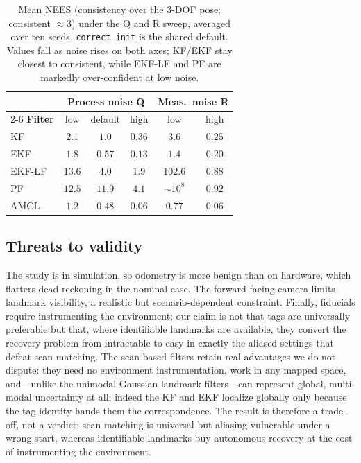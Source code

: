 \documentclass[conference]{IEEEtran}
\begin{document}
\begin{table}[!t]
\centering
\setlength{\tabcolsep}{0.45em}
{\renewcommand{\arraystretch}{1.25}
\begin{tabular}{|l|c|c|c|c|c|}
\hline
 & \multicolumn{3}{c|}{\textbf{Process noise Q}} & \multicolumn{2}{c|}{\textbf{Meas.\ noise R}} \\ \cline{2-6}
\textbf{Filter} & low & default & high & low & high \\ \hline
KF      & $2.1$  & $1.0$  & $0.36$ & $3.6$            & $0.25$ \\ \hline
EKF     & $1.8$  & $0.57$ & $0.13$ & $1.4$            & $0.20$ \\ \hline
EKF-LF  & $13.6$ & $4.0$  & $1.9$  & $102.6$          & $0.88$ \\ \hline
PF      & $12.5$ & $11.9$ & $4.1$  & $\sim\!10^{8}$   & $0.92$ \\ \hline
AMCL    & $1.2$  & $0.48$ & $0.06$ & $0.77$           & $0.06$ \\ \hline
\end{tabular}}
\caption{Mean NEES (consistency over the 3-DOF pose; consistent $\approx 3$) under the Q and R sweep, averaged over ten seeds. \texttt{correct\_init} is the shared default. Values fall as noise rises on both axes; KF/EKF stay closest to consistent, while EKF-LF and PF are markedly over-confident at low noise.}
\label{tab:nees}
\end{table}

\subsection{Threats to validity}
The study is in simulation, so odometry is more benign than on hardware, which flatters dead reckoning in the nominal case. The forward-facing camera limits landmark visibility, a realistic but scenario-dependent constraint. Finally, fiducials require instrumenting the environment; our claim is not that tags are universally preferable but that, where identifiable landmarks are available, they convert the recovery problem from intractable to easy in exactly the aliased settings that defeat scan matching. The scan-based filters retain real advantages we do not dispute: they need no environment instrumentation, work in any mapped space, and---unlike the unimodal Gaussian landmark filters---can represent global, multi-modal uncertainty at all; indeed the KF and EKF localize globally only because the tag identity hands them the correspondence. The result is therefore a trade-off, not a verdict: scan matching is universal but aliasing-vulnerable under a wrong start, whereas identifiable landmarks buy autonomous recovery at the cost of instrumenting the environment.
\end{document}
